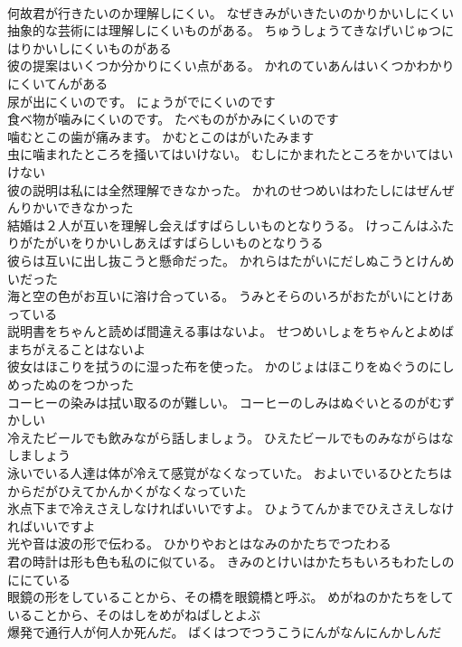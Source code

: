 \documentclass[8pt]{extreport}
\begin{document}
\begin{CJK}{UTF8}{min}
\\	何故君が行きたいのか理解しにくい。	なぜきみがいきたいのかりかいしにくい 
\\	抽象的な芸術には理解しにくいものがある。	ちゅうしょうてきなげいじゅつにはりかいしにくいものがある 
\\	彼の提案はいくつか分かりにくい点がある。	かれのていあんはいくつかわかりにくいてんがある 
\\	尿が出にくいのです。	にょうがでにくいのです 
\\	食べ物が噛みにくいのです。	たべものがかみにくいのです 
\\	噛むとこの歯が痛みます。	かむとこのはがいたみます 
\\	虫に噛まれたところを掻いてはいけない。	むしにかまれたところをかいてはいけない 
\\	彼の説明は私には全然理解できなかった。	かれのせつめいはわたしにはぜんぜんりかいできなかった 
\\	結婚は２人が互いを理解し会えばすばらしいものとなりうる。	けっこんはふたりがたがいをりかいしあえばすばらしいものとなりうる 
\\	彼らは互いに出し抜こうと懸命だった。	かれらはたがいにだしぬこうとけんめいだった 
\\	海と空の色がお互いに溶け合っている。	うみとそらのいろがおたがいにとけあっている 
\\	説明書をちゃんと読めば間違える事はないよ。	せつめいしょをちゃんとよめばまちがえることはないよ 
\\	彼女はほこりを拭うのに湿った布を使った。	かのじょはほこりをぬぐうのにしめったぬのをつかった 
\\	コーヒーの染みは拭い取るのが難しい。	コーヒーのしみはぬぐいとるのがむずかしい 
\\	冷えたビールでも飲みながら話しましょう。	ひえたビールでものみながらはなしましょう 
\\	泳いでいる人達は体が冷えて感覚がなくなっていた。	およいでいるひとたちはからだがひえてかんかくがなくなっていた 
\\	氷点下まで冷えさえしなければいいですよ。	ひょうてんかまでひえさえしなければいいですよ 
\\	光や音は波の形で伝わる。	ひかりやおとはなみのかたちでつたわる 
\\	君の時計は形も色も私のに似ている。	きみのとけいはかたちもいろもわたしのににている 
\\	眼鏡の形をしていることから、その橋を眼鏡橋と呼ぶ。	めがねのかたちをしていることから、そのはしをめがねばしとよぶ 
\\	爆発で通行人が何人か死んだ。	ばくはつでつうこうにんがなんにんかしんだ 

\end{CJK}
\end{document}
